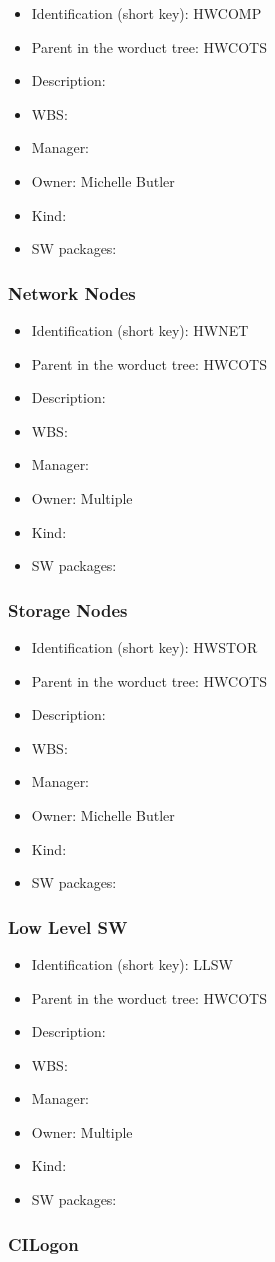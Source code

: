 \begin{itemize}\item Identification (short key): HWCOMP
\item Parent in the worduct tree: HWCOTS
\item Description: 
\item WBS: 
\item Manager: 
\item Owner: Michelle Butler
\item Kind:
\item SW packages: 
\end{itemize}\subsubsection{Network Nodes}
\begin{itemize}\item Identification (short key): HWNET
\item Parent in the worduct tree: HWCOTS
\item Description: 
\item WBS: 
\item Manager: 
\item Owner: Multiple
\item Kind:
\item SW packages: 
\end{itemize}\subsubsection{Storage Nodes}
\begin{itemize}\item Identification (short key): HWSTOR
\item Parent in the worduct tree: HWCOTS
\item Description: 
\item WBS: 
\item Manager: 
\item Owner: Michelle Butler
\item Kind:
\item SW packages: 
\end{itemize}\subsubsection{Low Level SW}
\begin{itemize}\item Identification (short key): LLSW
\item Parent in the worduct tree: HWCOTS
\item Description: 
\item WBS: 
\item Manager: 
\item Owner: Multiple
\item Kind:
\item SW packages: 
\end{itemize}\subsubsection{CILogon}
